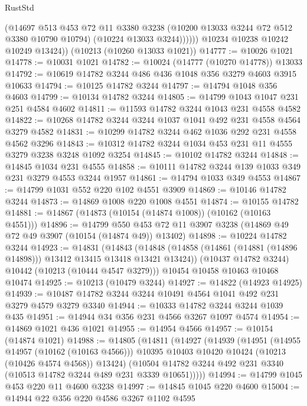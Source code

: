 \begin{lexlean}{RustStd}
\begin{coremodule}
{\begin{coremodule}
{{{{{{{{{{{{{{{{{{{{{{{{{{                (@14697
                  @513
                  @453
                  @72
                  @11
                  @3380
                  @3238
                  (@10200 @13033 @3244 @72 @512 @3380 @10790 @10794)
                  (@10224 @13033 @3244))))))
        @10234
        @10238
        @10242
        @10249
        @13424))
    (@10213 (@10260 @13033 @1021))
@14777 := @10026 @1021
@14778 := @10031 @1021
@14782 := @10024 (@14777 (@10270 @14778)) @13033
@14792 := @10619 @14782 @3244 @486 @436 @1048 @356 @3279 @4603 @3915 @10633
@14794 := @10125 @14782 @3244
@14797 := @14794 @1048 @356 @4603
@14799 := @10134 @14782 @3244
@14805 := @14799 @1043 @1047 @231 @251 @4584 @4602
@14811 := @11593 @14782 @3244 @1043 @231 @4558 @4582
@14822 := @10268 @14782 @3244 @3244 @1037 @1041 @492 @231 @4558 @4564 @3279 @4582
@14831 := @10299 @14782 @3244 @462 @1036 @292 @231 @4558 @4562 @3296
@14843 := @10312 @14782 @3244 @1034 @453 @231 @11 @4555 @3279 @3238 @3248 @1092 @3254
@14845 := @10102 @14782 @3244
@14848 := @14845 @1034 @231 @4555
@14858 := @10111 @14782 @3244 @139 @1033 @349 @231 @3279 @4553 @3244 @1957
@14861 := @14794 @1033 @349 @4553
@14867 := @14799 @1031 @552 @220 @102 @4551 @3909
@14869 := @10146 @14782 @3244
@14873 := @14869 @1008 @220 @1008 @4551
@14874 := @10155 @14782
@14881 := @14867 (@14873 (@10154 (@14874 @1008)) (@10162 (@10163 @4551)))
@14896 := @14799
    @550
    @453
    @72
    @11
    @3907
    @3238
    (@14869 @49 @72 @49 @3907 (@10154 (@14874 @49)) @13402)
@14898 := @10224 @14782 @3244
@14923 := @14831
    (@14843
      (@14848 (@14858 (@14861 (@14881 (@14896 @14898))) @13412 @13415 @13418 @13421 @13424))
      (@10437 @14782 @3244)
      @10442
      (@10213 (@10444 @4547 @3279)))
    @10454
    @10458
    @10463
    @10468
    @10474
@14925 := @10213 (@10479 @3244)
@14927 := @14822 (@14923 @14925)
@14939 := @10487 @14782 @3244 @3244 @10491 @4564 @1041 @492 @231 @3279 @4579 @3279 @3340
@14944 := @10333 @14782 @3244 @3244 @1039 @435
@14951 := @14944 @34 @356 @231 @4566 @3267 @1097 @4574
@14954 := @14869 @1021 @436 @1021
@14955 := @14954 @4566
@14957 := @10154 (@14874 @1021)
@14988 := @14805
    (@14811
      (@14927
        (@14939
          (@14951
            (@14955 @14957 (@10162 (@10163 @4566)))
            @10395
            @10403
            @10420
            @10424
            (@10213 (@10426 @4574 @4568))
            @13424)
          (@10504 @14782 @3244 @492 @231 @3340 (@10513 @14782 @3244 @489 @231 @3339 @10651)))))
@14994 := @14799 @1045 @453 @220 @11 @4600 @3238
@14997 := @14845 @1045 @220 @4600
@15004 := @14944 @22 @356 @220 @4586 @3267 @1102 @4595
}}}}}}}}}}}}}}}}}}}}}}}}}}
\end{coremodule}}
\end{coremodule}
\end{lexlean}
